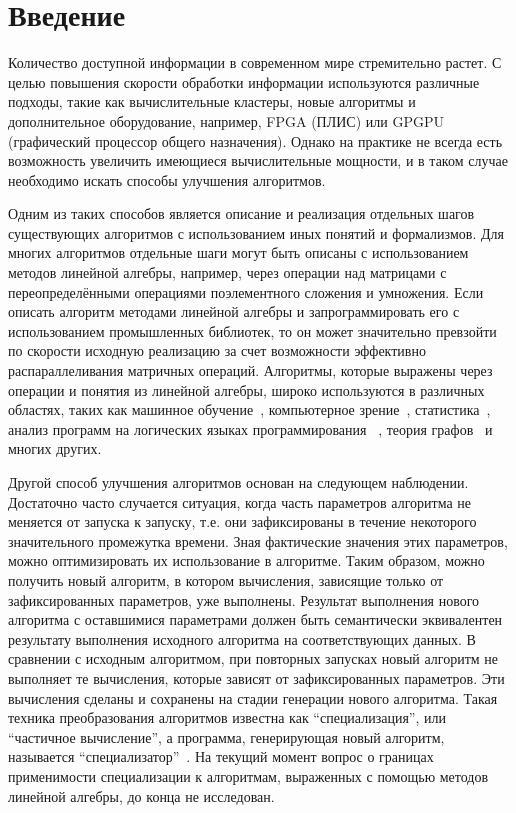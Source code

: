 \section*{Введение}

Количество доступной информации в современном мире стремительно растет.
С целью повышения скорости обработки информации используются различные подходы, такие как вычислительные кластеры, новые алгоритмы и дополнительное оборудование, например, FPGA (ПЛИС) или GPGPU (графический процессор общего назначения). 
Однако на практике не всегда есть возможность увеличить имеющиеся вычислительные мощности, и в таком случае необходимо искать способы улучшения алгоритмов.

Одним из таких способов является описание и реализация отдельных шагов существующих алгоритмов  с использованием иных понятий и формализмов.
Для многих алгоритмов отдельные шаги могут быть описаны с использованием методов линейной алгебры, например, через операции над матрицами с переопределёнными операциями поэлементного сложения и умножения.
Если описать алгоритм методами линейной алгебры и запрограммировать его с использованием промышленных библиотек, то он может значительно превзойти по скорости исходную реализацию за счет возможности эффективно распараллеливания матричных операций.
Алгоритмы, которые выражены через операции и понятия из линейной алгебры, широко используются в различных областях, таких как машинное обучение~\cite{LA_ML}, компьютерное зрение~\cite{LA_CV}, статистика~\cite{LA_STAT}, анализ программ на логических языках программирования ~\cite{part_eval_logic}, теория графов~\cite{SuiteSparse} и многих других.

Другой способ улучшения алгоритмов основан на следующем наблюдении. 
Достаточно часто случается ситуация, когда часть параметров алгоритма не меняется от запуска к запуску, т.е. они зафиксированы в течение некоторого значительного промежутка времени.
Зная фактические значения этих параметров, можно оптимизировать их использование в алгоритме. 
Таким образом, можно получить новый алгоритм, в котором вычисления, зависящие только от зафиксированных параметров, уже выполнены.
Результат выполнения нового алгоритма с оставшимися параметрами должен быть семантически эквивалентен результату выполнения исходного алгоритма на соответствующих данных. 
В сравнении с исходным алгоритмом, при повторных запусках новый алгоритм не выполняет те вычисления, которые зависят от зафиксированных параметров. 
Эти вычисления сделаны и сохранены на стадии генерации нового алгоритма.
Такая техника преобразования алгоритмов известна как “специализация”, или “частичное вычисление”, а программа, генерирующая новый алгоритм, называется “специализатор”~\cite{Jones_spec}.
На текущий момент вопрос о границах применимости специализации к алгоритмам, выраженных с помощью методов линейной алгебры, до конца не исследован.

